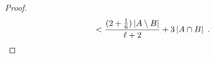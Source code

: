 \documentclass{patmorin}
\newcommand{\pat}[1]{\textcolor{Blue}{[Pat: #1]}}
\begin{document}
\begin{proof}
\begin{align*}
    & < \frac{(2+\tfrac{1}{6})\,|A\setminus B|}{\ell+2} + 3\,|A\cap B| \enspace . \qedhere
  \end{align*}
\end{proof}



\end{document}
